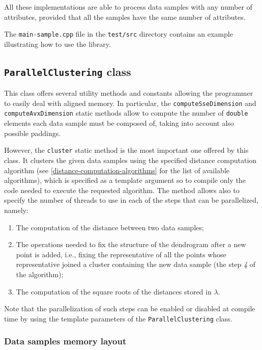 \documentclass{article}
\begin{document}
All these implementations are able to process data samples with any number of attributes, provided that all the samples have the same number of attributes.

The \texttt{main-sample.cpp} file in the \texttt{test/src} directory contains an example
illustrating how to use the library.

\hypertarget{parallel-clustering}{%
\subsection{\texttt{ParallelClustering} class}
\label{parallel-clustering}}
This class offers several utility methods and constants allowing the programmer to easily deal
with aligned memory. In particular, the \texttt{computeSseDimension} and
\texttt{computeAvxDimension} static methods allow to compute the number of \texttt{double}
elements each data sample must be composed of, taking into account also possible paddings.

However, the \texttt{cluster} static method is the most important one offered by this class. It clusters
the given data samples using the specified distance computation algorithm (see
\ref{distance-computation-algorithms} for the list of available algorithms), which
is specified as a template argument so to compile only the code needed to execute the requested
algorithm.
The method allows also to specify the number of threads to use in each of the steps that can be
parallelized, namely:
\begin{enumerate}
\item The computation of the distance between two data samples;
\item The operations needed to fix the structure of the dendrogram after a new point is
added, i.e., fixing the representative of all the points whose representative joined a
cluster containing the new data sample (the step \textit{4} of the algorithm);
\item The computation of the square roots of the distances stored in $\lambda$.
\end{enumerate}
Note that the parallelization of such steps can be enabled or disabled at compile time by using the
template parameters of the \texttt{ParallelClustering} class.

\hypertarget{par-data-samples-layout}{
\subsubsection{Data samples memory layout}
\label{par-data-samples-layout}}
\end{document}
